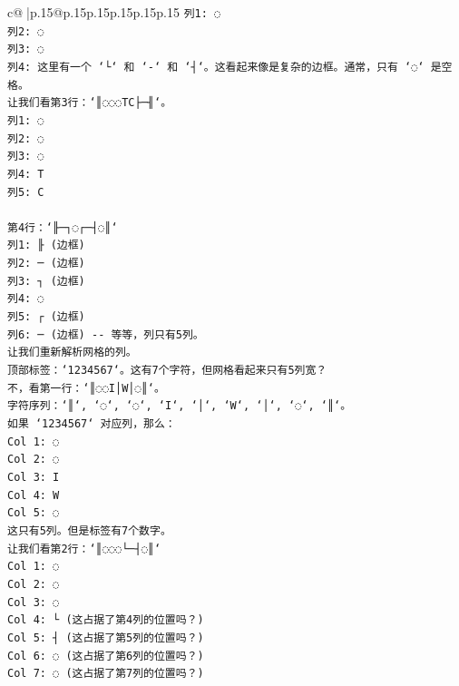 \documentclass{article}
\begin{document}
{\begin{supertabular}{c@{$\;$}|p{.15\linewidth}@{}p{.15\linewidth}p{.15\linewidth}p{.15\linewidth}p{.15\linewidth}p{.15\linewidth}}
{{{\texttt{列1: ◌} \\
\texttt{列2: ◌} \\
\texttt{列3: ◌} \\
\texttt{列4: 这里有一个 `└` 和 `{-}` 和 `┤`。这看起来像是复杂的边框。通常，只有 `◌` 是空格。} \\
\texttt{让我们看第3行：`║◌◌◌TC├─╢`。} \\
\texttt{列1: ◌} \\
\texttt{列2: ◌} \\
\texttt{列3: ◌} \\
\texttt{列4: T} \\
\texttt{列5: C} \\
\\ 
\texttt{第4行：`╟─┐◌┌─┤◌║`} \\
\texttt{列1: ╟ (边框)} \\
\texttt{列2: ─ (边框)} \\
\texttt{列3: ┐ (边框)} \\
\texttt{列4: ◌} \\
\texttt{列5: ┌ (边框)} \\
\texttt{列6: ─ (边框) {-}{-} 等等，列只有5列。} \\
\texttt{让我们重新解析网格的列。} \\
\texttt{顶部标签：`1234567`。这有7个字符，但网格看起来只有5列宽？} \\
\texttt{不，看第一行：`║◌◌I│W│◌║`。} \\
\texttt{字符序列：`║`, `◌`, `◌`, `I`, `│`, `W`, `│`, `◌`, `║`。} \\
\texttt{如果 `1234567` 对应列，那么：} \\
\texttt{Col 1: ◌} \\
\texttt{Col 2: ◌} \\
\texttt{Col 3: I} \\
\texttt{Col 4: W} \\
\texttt{Col 5: ◌} \\
\texttt{这只有5列。但是标签有7个数字。} \\
\texttt{让我们看第2行：`║◌◌◌└─┤◌║`} \\
\texttt{Col 1: ◌} \\
\texttt{Col 2: ◌} \\
\texttt{Col 3: ◌} \\
\texttt{Col 4: └ (这占据了第4列的位置吗？)} \\
\texttt{Col 5: ┤ (这占据了第5列的位置吗？)} \\
\texttt{Col 6: ◌ (这占据了第6列的位置吗？)} \\
\texttt{Col 7: ◌ (这占据了第7列的位置吗？)} \\
}}}
\end{supertabular}}
\end{document}
